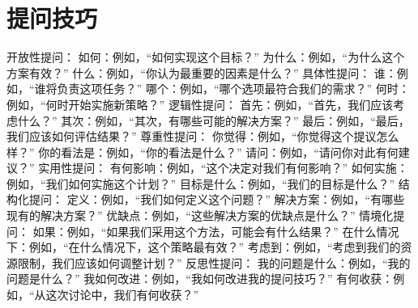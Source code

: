 \documentclass[12pt]{book}
\begin{document}
\section{提问技巧}
开放性提问：
如何：例如，“如何实现这个目标？”
为什么：例如，“为什么这个方案有效？”
什么：例如，“你认为最重要的因素是什么？”
具体性提问：
谁：例如，“谁将负责这项任务？”
哪个：例如，“哪个选项最符合我们的需求？”
何时：例如，“何时开始实施新策略？”
逻辑性提问：
首先：例如，“首先，我们应该考虑什么？”
其次：例如，“其次，有哪些可能的解决方案？”
最后：例如，“最后，我们应该如何评估结果？”
尊重性提问：
你觉得：例如，“你觉得这个提议怎么样？”
你的看法是：例如，“你的看法是什么？”
请问：例如，“请问你对此有何建议？”
实用性提问：
有何影响：例如，“这个决定对我们有何影响？”
如何实施：例如，“我们如何实施这个计划？”
目标是什么：例如，“我们的目标是什么？”
结构化提问：
定义：例如，“我们如何定义这个问题？”
解决方案：例如，“有哪些现有的解决方案？”
优缺点：例如，“这些解决方案的优缺点是什么？”
情境化提问：
如果：例如，“如果我们采用这个方法，可能会有什么结果？”
在什么情况下：例如，“在什么情况下，这个策略最有效？”
考虑到：例如，“考虑到我们的资源限制，我们应该如何调整计划？”
反思性提问：
我的问题是什么：例如，“我的问题是什么？”
我如何改进：例如，“我如何改进我的提问技巧？”
有何收获：例如，“从这次讨论中，我们有何收获？”
\end{document}
